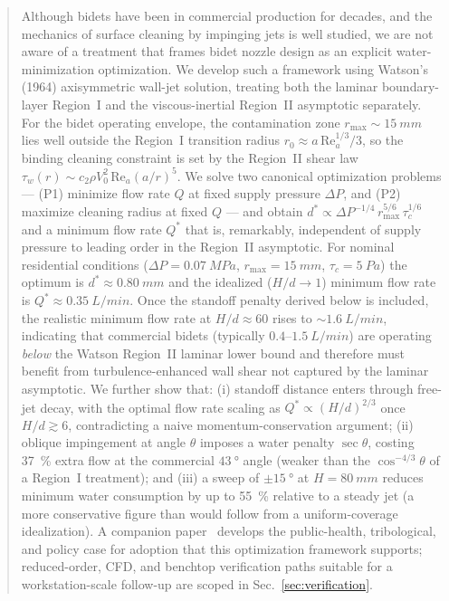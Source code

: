 \documentclass[aps,prfluids,reprint,amsmath,amssymb,floatfix]{revtex4-2}
\newcommand{\Rey}{\mathrm{Re}}
\begin{document}
\date{\today}

\begin{abstract}
Although bidets have been in commercial production for decades, and the
mechanics of surface cleaning by impinging jets is well studied, we are not
aware of a treatment that frames bidet nozzle design as an explicit
water-minimization optimization. We
develop such a framework using Watson's (1964) axisymmetric wall-jet solution,
treating both the laminar boundary-layer Region~I and the viscous-inertial
Region~II asymptotic separately. For the bidet operating envelope, the
contamination zone $r_\mathrm{max} \sim \SI{15}{mm}$ lies well outside
the Region~I transition radius $r_0 \approx a\,\Rey_a^{1/3}/3$, so the
binding cleaning constraint is set by the Region~II shear law
$\tau_w(r) \sim c_2 \rho V_0^2\,\Rey_a (a/r)^5$. We solve two canonical
optimization problems --- (P1) minimize flow rate $Q$ at fixed supply
pressure $\Delta P$, and (P2) maximize cleaning radius at fixed $Q$ ---
and obtain $d^* \propto \Delta P^{-1/4}\,r_\mathrm{max}^{5/6}\,\tau_c^{1/6}$
and a minimum flow rate $Q^*$ that is, remarkably, independent of supply
pressure to leading order in the Region~II asymptotic. For nominal
residential conditions ($\Delta P = \SI{0.07}{MPa}$, $r_\mathrm{max} = \SI{15}{mm}$,
$\tau_c = \SI{5}{Pa}$) the optimum is
$d^* \approx \SI{0.80}{mm}$ and the idealized
($H/d \to 1$) minimum flow rate is $Q^* \approx \SI{0.35}{L/min}$. Once
the standoff penalty derived below is included, the realistic minimum
flow rate at $H/d \approx 60$ rises to $\sim \SI{1.6}{L/min}$, indicating
that commercial bidets (typically $0.4$--$\SI{1.5}{L/min}$) are operating
\emph{below} the Watson Region~II laminar lower bound and therefore must
benefit from turbulence-enhanced wall shear not captured by the laminar
asymptotic. We further show that: (i) standoff
distance enters through free-jet decay, with the optimal flow rate
scaling as $Q^* \propto (H/d)^{2/3}$ once $H/d \gtrsim 6$, contradicting
a naive momentum-conservation argument; (ii) oblique impingement at
angle $\theta$ imposes a water penalty $\sec\theta$, costing
\SI{37}{\percent} extra flow at the commercial $\SI{43}{\degree}$ angle
(weaker than the $\cos^{-4/3}\theta$ of a Region~I treatment);
and (iii) a sweep of $\pm\SI{15}{\degree}$ at $H = \SI{80}{mm}$
reduces minimum water consumption by up to \SI{55}{\percent} relative
to a steady jet (a more conservative figure than would follow from a
uniform-coverage idealization). A companion paper~\citep{BurtonCasePaper}
develops the public-health, tribological, and policy case for adoption
that this optimization framework supports; reduced-order, CFD, and
benchtop verification paths suitable for a workstation-scale
follow-up are scoped in Sec.~\ref{sec:verification}.
\end{abstract}
\end{document}
